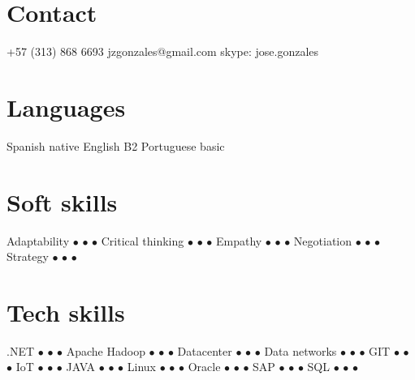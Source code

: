 \documentclass[]{friggeri-cv} %
\begin{document}


\begin{aside} %
\section{Contact}
+57 (313) 868 6693
jzgonzales@gmail.com
skype: jose.gonzales
\section{Languages}
Spanish native
English B2
Portuguese basic
\section{Soft skills}
Adaptability {\color{white} $\bullet$ \color{bullet} $\bullet$ $\bullet$}
Critical thinking {\color{bullet} $\bullet$ $\bullet$ $\bullet$}
Empathy {\color{bullet} $\bullet$ $\bullet$ $\bullet$}
Negotiation {\color{white} $\bullet$ \color{bullet} $\bullet$ $\bullet$}
Strategy {\color{bullet} $\bullet$ $\bullet$ $\bullet$}
\section{Tech skills}
.NET {\color{white} \color{bullet} $\bullet$ $\bullet$ $\bullet$}
Apache Hadoop {\color{white} $\bullet$ \color{bullet} $\bullet$ $\bullet$}
Datacenter {\color{bullet} $\bullet$ $\bullet$ $\bullet$}
Data networks {\color{white} \color{bullet} $\bullet$ $\bullet$ $\bullet$}
GIT {\color{white} $\bullet$ \color{bullet} $\bullet$ $\bullet$}
IoT {\color{white} $\bullet$ \color{bullet} $\bullet$ $\bullet$}
JAVA {\color{white} $\bullet$ $\bullet$ \color{bullet} $\bullet$}
Linux {\color{white} \color{bullet} $\bullet$ $\bullet$ $\bullet$}
Oracle {\color{white} $\bullet$ \color{bullet} $\bullet$ $\bullet$}
SAP {\color{white} $\bullet$ \color{bullet} $\bullet$ $\bullet$}
SQL {\color{bullet} $\bullet$ $\bullet$ $\bullet$}
\end{aside}
\end{document}
